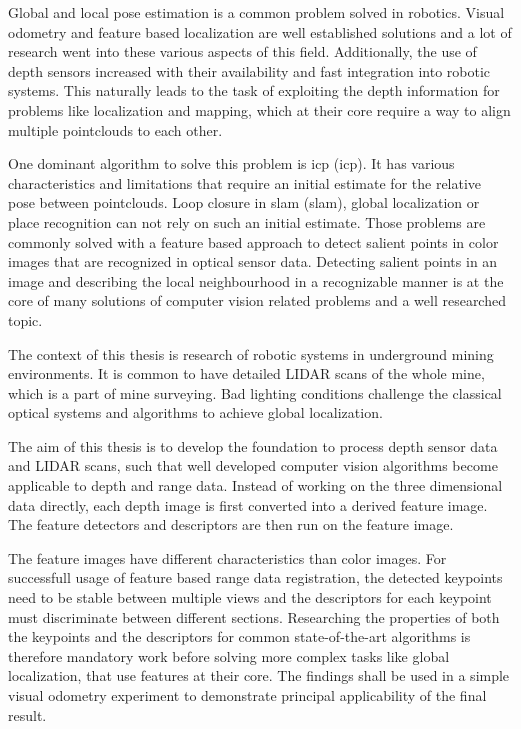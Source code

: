 
Global and local pose estimation is a common problem solved in robotics.
Visual odometry and feature based localization are well established solutions and a lot of research went into these various aspects of this field.
Additionally, the use of depth sensors increased with their availability and fast integration into robotic systems.
This naturally leads to the task of exploiting the depth information for problems like localization and mapping, which at their core require a way to align multiple pointclouds to each other.

One dominant algorithm to solve this problem is \acrshort{icp} (\acrlong{icp}).
It has various characteristics and limitations that require an initial estimate for the relative pose between pointclouds.
Loop closure in \acrshort{slam} (\acrlong{slam}), global localization or place recognition can not rely on such an initial estimate.
Those problems are commonly solved with a feature based approach to detect salient points in color images that are recognized in optical sensor data.
Detecting salient points in an image and describing the local neighbourhood in a recognizable manner is at the core of many solutions of computer vision related problems and a well researched topic.

The context of this thesis is research of robotic systems in underground mining environments.
It is common to have detailed \acrshort{LIDAR} scans of the whole mine, which is a part of mine surveying.
Bad lighting conditions challenge the classical optical systems and algorithms to achieve global localization.



The aim of this thesis is to develop the foundation to process depth sensor data and \acrshort{LIDAR} scans, such that well developed computer vision algorithms become applicable to depth and range data.
Instead of working on the three dimensional data directly, each depth image is first converted into a derived feature image.
The feature detectors and descriptors are then run on the feature image.

The feature images have different characteristics than color images.
For successfull usage of feature based range data registration, the detected keypoints need to be stable between multiple views and the descriptors for each keypoint must discriminate between different sections.
Researching the properties of both the keypoints and the descriptors for common state-of-the-art algorithms is therefore mandatory work before solving more complex tasks like global localization, that use features at their core.
The findings shall be used in a simple visual odometry experiment to demonstrate principal applicability of the final result.

